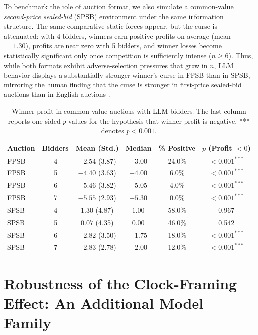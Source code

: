 \documentclass[acmsmall,screen,review]{acmart}
\newcommand{\rev}[1]{{\color{blue}#1}}
\newcommand{\rev}[1]{#1}
\begin{document}
To benchmark the role of auction format, we also simulate a common-value \emph{second-price sealed-bid} (SPSB) environment under the same information structure. The same comparative-static forces appear, but the curse is attenuated: with 4 bidders, winners earn positive profits on average (mean $=1.30$), profits are near zero with 5 bidders, and winner losses become statistically significant only once competition is sufficiently intense ($n\ge 6$). Thus, while both formats exhibit adverse-selection pressures that grow in $n$, LLM behavior displays a substantially stronger winner’s curse in FPSB than in SPSB, mirroring \rev{the human finding that the curse is stronger in first-price sealed-bid auctions than in English auctions \citep{kagel1986winner, levin1996revenue}}.

\begin{table}[htbp]
\centering
\begin{tabular}{lccccc}
\toprule
\textbf{Auction} & \textbf{Bidders} & \textbf{Mean (Std.)} & \textbf{Median} & \textbf{\% Positive} & \textbf{$p$ (Profit $<0$)} \\
\midrule
FPSB & 4 & $-2.54$ (3.87) & $-3.00$ & 24.0\% & $<0.001^{***}$ \\
FPSB & 5 & $-4.40$ (3.63) & $-4.00$ & 6.0\%  & $<0.001^{***}$ \\
FPSB & 6 & $-5.46$ (3.82) & $-5.05$ & 4.0\%  & $<0.001^{***}$ \\
FPSB & 7 & $-5.55$ (2.93) & $-5.30$ & 0.0\%  & $<0.001^{***}$ \\
\midrule
SPSB & 4 & $1.30$ (4.87)  & $1.00$  & 58.0\% & 0.967 \\
SPSB & 5 & $0.07$ (4.35)  & $0.00$  & 46.0\% & 0.542 \\
SPSB & 6 & $-2.82$ (3.50) & $-1.75$ & 18.0\% & $<0.001^{***}$ \\
SPSB & 7 & $-2.83$ (2.78) & $-2.00$ & 12.0\% & $<0.001^{***}$ \\
\bottomrule
\end{tabular}
\caption{Winner profit in common-value auctions with LLM bidders. The last column reports one-sided $p$-values for the hypothesis that winner profit is negative. *** denotes $p < 0.001$.}
\label{tab:winner_curse_llm}
\end{table}

\section{\texorpdfstring{Robustness of the Clock-Framing Effect: An Additional Model Family}{Robustness of the Clock-Framing Effect: An Additional Model Family}}\label{app:clock_robustness}
\end{document}
